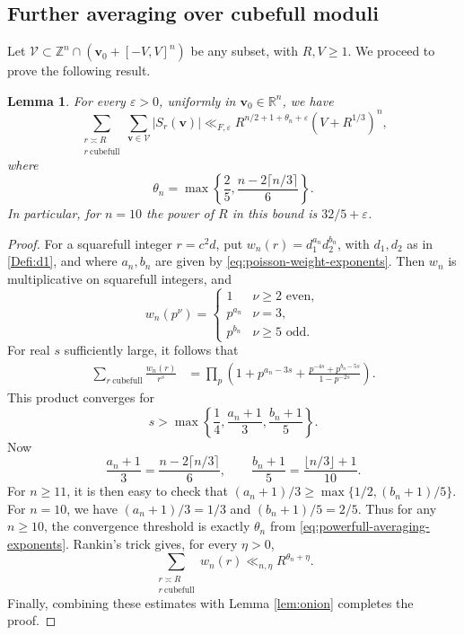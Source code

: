 \documentclass[a4paper,11pt, twoside,reqno]{amsart}
\theoremstyle{plain}
\newtheorem{lemma}[thm]{Lemma}
\theoremstyle{definition}
\theoremstyle{remark}
\newcommand{\bfv}{\bm{v}}
\newcommand{\ZZ}{\mathbb{Z}}
\newcommand{\RR}{\mathbb{R}}
\newcommand{\ve}{\varepsilon}
\renewcommand{\ge}{\geqslant}
\numberwithin{equation}{section}
\begin{document}
\subsection{Further averaging over cubefull  moduli} 

Let 
$\mathcal V\subset\ZZ^n\cap(\bfv_0+[-V,V]^n)$ be any subset, 
with  $R,V\ge1$.
We proceed to prove the following result. 

\begin{lemma}\label{Le: Cubefull.finalbound}
For every $\ve>0$, uniformly in $\bfv_0\in\RR^n$, we have
\begin{equation}\label{eq:cubefull-average-sharp}
 \sum_{\substack{r\asymp R\\r\ \mathrm{cubefull}}}
 \sum_{\bfv\in\mathcal V}|S_r(\bfv)|
 \ll_{F,\ve}
 R^{n/2+1+\theta_n+\ve}(V+R^{1/3})^n,
\end{equation}
where 
\begin{equation}\label{eq:powerfull-averaging-exponents}
 \theta_n=\max\left\{\frac25,\frac{n-2\lceil n/3\rceil}{6}\right\}.
\end{equation}
In particular, for $n=10$ the power of $R$ in this bound is
$32/5+\ve$.
\end{lemma}

\begin{proof}
For a squarefull integer $r=c^2d$, put
$w_n(r)=d_1^{a_n}d_2^{b_n}$, with $d_1,d_2$ as in \eqref{Defi:d1}, and where $a_n,b_n$ are given by \eqref{eq:poisson-weight-exponents}.
Then $w_n$ is multiplicative on squarefull integers, and
\[
 w_n(p^\nu)=
 \begin{cases}
  1&\nu\ge2\text{ even},\\
  p^{a_n}&\nu=3,\\
  p^{b_n}&\nu\ge5\text{ odd}.
 \end{cases}
\]
For real $s$ sufficiently large, it follows that
\begin{align*}
 \sum_{r\ \mathrm{cubefull}}\frac{w_n(r)}{r^s}
 &=\prod_p\left(
  1+p^{a_n-3s}
   +\frac{p^{-4s}+p^{b_n-5s}}{1-p^{-2s}}
 \right).
\end{align*}
This product converges for
\[
 s>\max\left\{\frac14,\frac{a_n+1}{3},\frac{b_n+1}{5}\right\}.
\]
Now
\[
 \frac{a_n+1}{3}=\frac{n-2\lceil n/3\rceil}{6},\qquad
 \frac{b_n+1}{5}=\frac{\lfloor n/3\rfloor+1}{10}.
\]
For $n\ge 11$, it is then easy to check that
$(a_n+1)/3 \ge \max\{1/2, (b_n+1)/5\}$.
For $n=10$, we have $(a_n+1)/3 = 1/3$ and $(b_n+1)/5 = 2/5$.
Thus for any $n\ge 10$, the convergence threshold is exactly
 $\theta_n$ from
\eqref{eq:powerfull-averaging-exponents}.
Rankin's trick gives, for every $\eta>0$,
\[
 \sum_{\substack{r\asymp R\\r\ \mathrm{cubefull}}}w_n(r)
 \ll_{n,\eta}R^{\theta_n+\eta}.
\]
Finally, 
combining these estimates with Lemma \ref{lem:onion}
completes the proof.
\end{proof}
\end{document}
